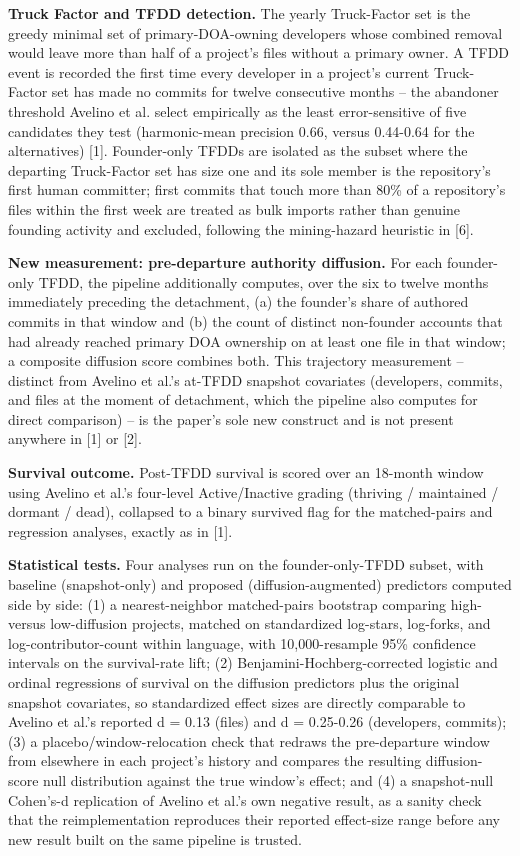 \documentclass[11pt,letterpaper]{article}
\begin{document}
\textbf{Truck Factor and TFDD detection.} The yearly Truck-Factor set is the greedy minimal set of primary-DOA-owning developers whose combined removal would leave more than half of a project's files without a primary owner. A TFDD event is recorded the first time every developer in a project's current Truck-Factor set has made no commits for twelve consecutive months -- the abandoner threshold Avelino et al. select empirically as the least error-sensitive of five candidates they test (harmonic-mean precision 0.66, versus 0.44-0.64 for the alternatives) [1]. Founder-only TFDDs are isolated as the subset where the departing Truck-Factor set has size one and its sole member is the repository's first human committer; first commits that touch more than 80\% of a repository's files within the first week are treated as bulk imports rather than genuine founding activity and excluded, following the mining-hazard heuristic in [6].

\textbf{New measurement: pre-departure authority diffusion.} For each founder-only TFDD, the pipeline additionally computes, over the six to twelve months immediately preceding the detachment, (a) the founder's share of authored commits in that window and (b) the count of distinct non-founder accounts that had already reached primary DOA ownership on at least one file in that window; a composite diffusion score combines both. This trajectory measurement -- distinct from Avelino et al.'s at-TFDD snapshot covariates (developers, commits, and files at the moment of detachment, which the pipeline also computes for direct comparison) -- is the paper's sole new construct and is not present anywhere in [1] or [2].

\textbf{Survival outcome.} Post-TFDD survival is scored over an 18-month window using Avelino et al.'s four-level Active/Inactive grading (thriving / maintained / dormant / dead), collapsed to a binary survived flag for the matched-pairs and regression analyses, exactly as in [1].

\textbf{Statistical tests.} Four analyses run on the founder-only-TFDD subset, with baseline (snapshot-only) and proposed (diffusion-augmented) predictors computed side by side: (1) a nearest-neighbor matched-pairs bootstrap comparing high- versus low-diffusion projects, matched on standardized log-stars, log-forks, and log-contributor-count within language, with 10,000-resample 95\% confidence intervals on the survival-rate lift; (2) Benjamini-Hochberg-corrected logistic and ordinal regressions of survival on the diffusion predictors plus the original snapshot covariates, so standardized effect sizes are directly comparable to Avelino et al.'s reported d = 0.13 (files) and d = 0.25-0.26 (developers, commits); (3) a placebo/window-relocation check that redraws the pre-departure window from elsewhere in each project's history and compares the resulting diffusion-score null distribution against the true window's effect; and (4) a snapshot-null Cohen's-d replication of Avelino et al.'s own negative result, as a sanity check that the reimplementation reproduces their reported effect-size range before any new result built on the same pipeline is trusted.
\end{document}
